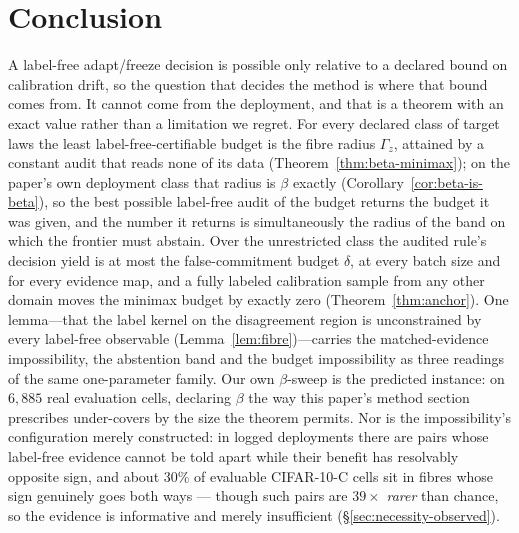\documentclass[conference]{IEEEtran}
\theoremstyle{plain}
\theoremstyle{definition}
\begin{document}
\section{Conclusion}
A label-free adapt/freeze decision is possible only relative to a declared bound on calibration
drift, so the question that decides the method is where that bound comes from. It cannot come from
the deployment, and that is a theorem with an exact value rather than a limitation we regret. For
every declared class of target laws the least label-free-certifiable budget is the fibre radius
$\Gamma_z$, attained by a constant audit that reads none of its data
(Theorem~\ref{thm:beta-minimax}); on the paper's own deployment class that radius is $\beta$ exactly
(Corollary~\ref{cor:beta-is-beta}), so the best possible label-free audit of the budget returns the
budget it was given, and the number it returns is simultaneously the radius of the band on which the
frontier must abstain. Over the unrestricted class the audited rule's decision yield is at most the
false-commitment budget $\delta$, at every batch size and for every evidence map, and a fully
labeled calibration sample from any other domain moves the minimax budget by exactly zero
(Theorem~\ref{thm:anchor}). One lemma---that the label kernel on the disagreement region is
unconstrained by every label-free observable (Lemma~\ref{lem:fibre})---carries the matched-evidence
impossibility, the abstention band and the budget impossibility as three readings of the same
one-parameter family. Our own $\beta$-sweep is the predicted instance: on $6{,}885$ real evaluation
cells, declaring $\beta$ the way this paper's method section prescribes under-covers by the size the
theorem permits. Nor is the impossibility's configuration merely constructed: in logged deployments
there are pairs whose label-free evidence cannot be told apart while their benefit has resolvably
opposite sign, and about $30\%$ of evaluable CIFAR-10-C cells sit in fibres whose sign genuinely
goes both ways --- though such pairs are $39\times$ \emph{rarer} than chance, so the evidence is
informative and merely insufficient (\S\ref{sec:necessity-observed}).
\end{document}
